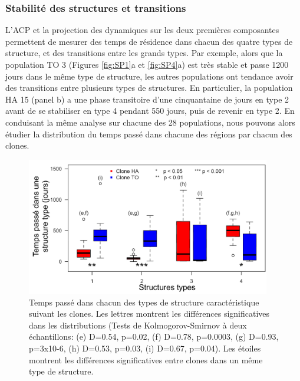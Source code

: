 \subsubsection{Stabilité des structures et transitions}

L'ACP et la projection des dynamiques sur les deux premières composantes
permettent de mesurer des temps de résidence dans chacun des quatre types de
structure, et des transitions entre les grands types. Par exemple, alors que la
population TO 3 (Figures \ref{fig:SP1}a et \ref{fig:SP4}a) est très stable et
passe 1200 jours dans le même type de structure, les autres populations ont
tendance avoir des transitions entre plusieurs types de structures. En
particulier, la population HA 15 (panel b) a une phase transitoire d'une
cinquantaine de jours en type 2 avant de se stabiliser en type 4 pendant 550
jours, puis de revenir en type 2. En conduisant la même analyse sur chacune des
28 populations, nous pouvons alors étudier la distribution du temps passé dans
chacune des régions par chacun des clones. 

\begin{figure}[!ht]
\begin{center}
\includegraphics[width=0.95\textwidth]{1_CorpsDeThese/Resumes/Fig/SP05}
\caption[Temps de
résidence dans les structures types]{Temps passé dans chacun des types de
structure caractéristique suivant les clones. Les lettres montrent les
différences significatives dans les distributions (Tests de Kolmogorov-Smirnov
à deux échantillons: (e) D=0.54, p=0.02, (f) D=0.78, p=0.0003, (g) D=0.93,
p=3x10-6, (h) D=0.53, p=0.03, (i) D=0.67, p=0.04). Les étoiles montrent les
différences significatives entre clones dans un même type de structure.}
\label{fig:SP5}
\end{center}
\end{figure}


